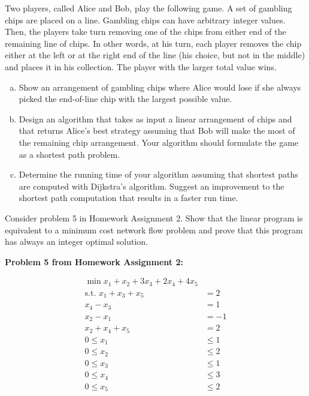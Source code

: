 \documentclass[fleqn]{homework}
\begin{document}
  \begin{problem}{5}
    \begin{question}
      Two players, called Alice and Bob, play the following game. A set of
      gambling chips are placed on a line. Gambling chips can have arbitrary
      integer values. Then, the players take turn removing one of the chips from
      either end of the remaining line of chips. In other words, at his turn,
      each player removes the chip either at the left or at the right end of the
      line (his choice, but not in the middle) and places it in his collection.
      The player with the larger total value wins.

      \begin{enumerate}[a.]
      \item Show an arrangement of gambling chips where Alice would lose if she
        always picked the end-of-line chip with the largest possible value.
      \item Design an algorithm that takes as input a linear arrangement of
        chips and that returns Alice’s best strategy assuming that Bob will make
        the most of the remaining chip arrangement. Your algorithm should
        formulate the game as a shortest path problem.  
      \item Determine the running time of your algorithm assuming that shortest
        paths are computed with Dijkstra’s algorithm. Suggest an improvement to
        the shortest path computation that results in a faster run time.
      \end{enumerate}
    \end{question}
  \end{problem}

  \begin{problem}{7}
    \begin{question}
      Consider problem 5 in Homework Assignment 2. Show that the linear program
      is equivalent to a minimum cost network ﬂow problem and prove that this
      program has always an integer optimal solution.

      \textbf{Problem 5 from Homework Assignment 2:}

      \begin{align*}
        \min x_1 + x_2 + 3x_3 + 2x_4 + 4x_5 & \\
        \text{s.t. } x_1 + x_3 + x_5 &= 2 \\
        x_4 - x_3 &= 1 \\
        x_2 - x_1 &= -1 \\
        x_2 + x_4 + x_5 &= 2 \\
        0 \le x_1 &\le 1 \\
        0 \le x_2 &\le 2 \\
        0 \le x_3 &\le 1 \\
        0 \le x_4 &\le 3 \\
        0 \le x_5 &\le 2 \\
      \end{align*}
    \end{question}
  \end{problem}
\end{document}

